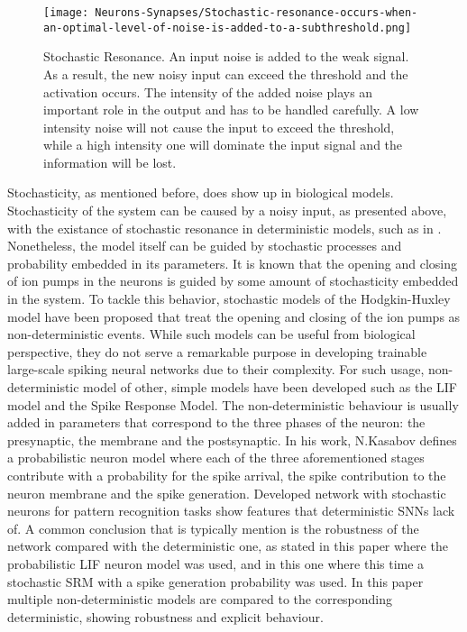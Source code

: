 \documentclass[12pt]{report}
\begin{document}
\begin{figure}[htp]
    \centering
    \texttt{[image: Neurons-Synapses/Stochastic-resonance-occurs-when-an-optimal-level-of-noise-is-added-to-a-subthreshold.png]}
    \caption{Stochastic Resonance. An input noise is added to the weak signal. As a result, the new noisy input can exceed the threshold and the activation occurs. The intensity of the added noise plays an important role in the output and has to be handled carefully. A low intensity noise will not cause the input to exceed the threshold, while a high intensity one will dominate the input signal and the information will be lost.}
    \label{fig:lif-neuron}
\end{figure}

Stochasticity, as mentioned before, does show up in biological models. Stochasticity of the system can be caused by a noisy input, as presented above, with the existance of stochastic resonance in deterministic models, such as in \cite{Clayton2011}. Nonetheless, the model itself can be guided by stochastic processes and probability embedded in its parameters. It is known that the opening and closing of ion pumps in the neurons is guided by some amount of stochasticity embedded in the system. To tackle this behavior, stochastic models of the Hodgkin-Huxley model have been proposed \cite{Fox1997} that treat the opening and closing of the ion pumps as non-deterministic events. While such models can be useful from biological perspective, they do not serve a remarkable purpose in developing trainable large-scale spiking neural networks due to their complexity. For such usage, non-deterministic model of other, simple models have been developed such as the LIF model and the Spike Response Model. The non-deterministic behaviour is usually added in parameters that correspond to the three phases of the neuron: the presynaptic, the membrane and the postsynaptic. In his work\cite{Kasabov2010}, N.Kasabov defines a probabilistic neuron model where each of the three aforementioned stages contribute with a probability for the spike arrival, the spike contribution to the neuron membrane and the spike generation. Developed network with stochastic neurons for pattern recognition tasks show features that deterministic SNNs lack of. A common conclusion that is typically mention is the robustness of the network compared with the deterministic one, as stated in this paper\cite{Dhoble2011} where the probabilistic LIF neuron model was used, and in this one\cite{Sinyavskiy2010} where this time a stochastic SRM with a spike generation probability was used. In this paper \cite{Wu2012} multiple non-deterministic models are compared to the corresponding deterministic, showing robustness and explicit behaviour.
\end{document}
